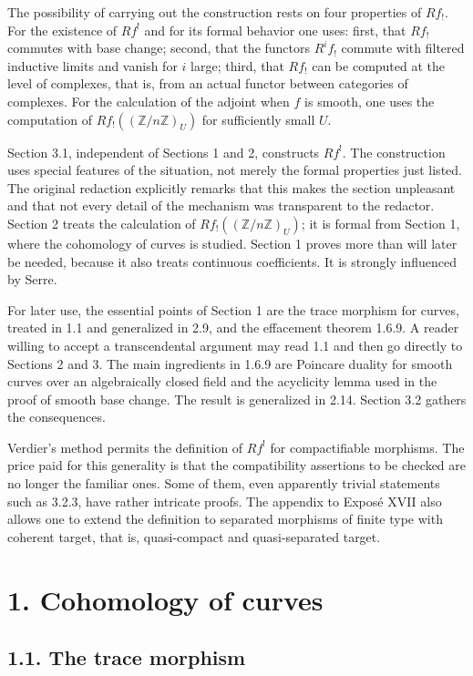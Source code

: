 \documentclass[12pt]{article}
\newcommand{\Zz}{\mathbb Z}
\begin{document}
The possibility of carrying out the construction rests on four properties of \(Rf_!\). For the existence of \(Rf^!\) and for its formal behavior one uses: first, that \(Rf_!\) commutes with base change; second, that the functors \(R^if_!\) commute with filtered inductive limits and vanish for \(i\) large; third, that \(Rf_!\) can be computed at the level of complexes, that is, from an actual functor between categories of complexes. For the calculation of the adjoint when \(f\) is smooth, one uses the computation of \(Rf_!((\Zz/n\Zz)_U)\) for sufficiently small \(U\).

Section 3.1, independent of Sections 1 and 2, constructs \(Rf^!\). The construction uses special features of the situation, not merely the formal properties just listed. The original redaction explicitly remarks that this makes the section unpleasant and that not every detail of the mechanism was transparent to the redactor. Section 2 treats the calculation of \(Rf_!((\Zz/n\Zz)_U)\); it is formal from Section 1, where the cohomology of curves is studied. Section 1 proves more than will later be needed, because it also treats continuous coefficients. It is strongly influenced by Serre.

For later use, the essential points of Section 1 are the trace morphism for curves, treated in 1.1 and generalized in 2.9, and the effacement theorem 1.6.9. A reader willing to accept a transcendental argument may read 1.1 and then go directly to Sections 2 and 3. The main ingredients in 1.6.9 are Poincare duality for smooth curves over an algebraically closed field and the acyclicity lemma used in the proof of smooth base change. The result is generalized in 2.14. Section 3.2 gathers the consequences.

Verdier's method permits the definition of \(Rf^!\) for compactifiable morphisms. The price paid for this generality is that the compatibility assertions to be checked are no longer the familiar ones. Some of them, even apparently trivial statements such as 3.2.3, have rather intricate proofs. The appendix to Expos\'e XVII also allows one to extend the definition to separated morphisms of finite type with coherent target, that is, quasi-compact and quasi-separated target.

\section*{1. Cohomology of curves}
\subsection*{1.1. The trace morphism}
\end{document}
